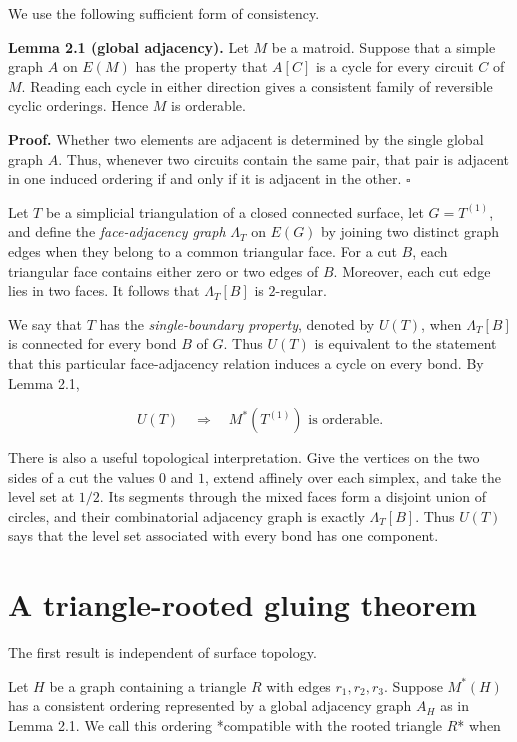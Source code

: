 \documentclass[11pt]{article}
\begin{document}
We use the following sufficient form of consistency.

\textbf{Lemma 2.1 (global adjacency).} Let $M$ be a matroid. Suppose that a simple
graph $A$ on $E(M)$ has the property that $A[C]$ is a cycle for every circuit
$C$ of $M$. Reading each cycle in either direction gives a consistent family
of reversible cyclic orderings. Hence $M$ is orderable.

\textbf{Proof.} Whether two elements are adjacent is determined by the single
global graph $A$. Thus, whenever two circuits contain the same pair, that pair
is adjacent in one induced ordering if and only if it is adjacent in the
other. $\square$

Let $T$ be a simplicial triangulation of a closed connected surface, let
$G=T^{(1)}$, and define the \emph{face-adjacency graph} $\Lambda_T$ on $E(G)$ by
joining two distinct graph edges when they belong to a common triangular
face. For a cut $B$, each triangular face contains either zero or two edges
of $B$. Moreover, each cut edge lies in two faces. It follows that
$\Lambda_T[B]$ is $2$-regular.

We say that $T$ has the \emph{single-boundary property}, denoted by $U(T)$, when
$\Lambda_T[B]$ is connected for every bond $B$ of $G$. Thus $U(T)$ is
equivalent to the statement that this particular face-adjacency relation
induces a cycle on every bond. By Lemma 2.1,

\[
U(T)\quad\Longrightarrow\quad M^*(T^{(1)})\text{ is orderable}.
\]

There is also a useful topological interpretation. Give the vertices on the
two sides of a cut the values $0$ and $1$, extend affinely over each simplex,
and take the level set at $1/2$. Its segments through the mixed faces form a
disjoint union of circles, and their combinatorial adjacency graph is exactly
$\Lambda_T[B]$. Thus $U(T)$ says that the level set associated with every
bond has one component.

\section{A triangle-rooted gluing theorem}


The first result is independent of surface topology.

Let $H$ be a graph containing a triangle $R$ with edges $r_1,r_2,r_3$.
Suppose $M^*(H)$ has a consistent ordering represented by a global adjacency
graph $A_H$ as in Lemma 2.1. We call this ordering *compatible with the rooted
triangle $R$* when
\end{document}
